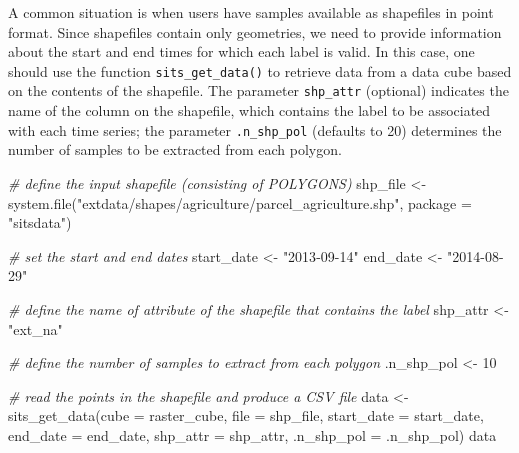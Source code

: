 \documentclass[a4paper,]{tufte-book}
\newenvironment{Shaded}{}{}
\newcommand{\AttributeTok}[1]{\textcolor[rgb]{0.49,0.56,0.16}{#1}}
\newcommand{\CommentTok}[1]{\textcolor[rgb]{0.38,0.63,0.69}{\textit{#1}}}
\newcommand{\DecValTok}[1]{\textcolor[rgb]{0.25,0.63,0.44}{#1}}
\newcommand{\FunctionTok}[1]{\textcolor[rgb]{0.02,0.16,0.49}{#1}}
\newcommand{\NormalTok}[1]{#1}
\newcommand{\OtherTok}[1]{\textcolor[rgb]{0.00,0.44,0.13}{#1}}
\newcommand{\StringTok}[1]{\textcolor[rgb]{0.25,0.44,0.63}{#1}}
\begin{document}
A common situation is when users have samples available as shapefiles in point format. Since shapefiles contain only geometries, we need to provide information about the start and end times for which each label is valid. In this case, one should use the function \texttt{sits\_get\_data()} to retrieve data from a data cube based on the contents of the shapefile. The parameter \texttt{shp\_attr} (optional) indicates the name of the column on the shapefile, which contains the label to be associated with each time series; the parameter \texttt{.n\_shp\_pol} (defaults to 20) determines the number of samples to be extracted from each polygon.

\begin{Shaded}
\begin{Highlighting}[]
\CommentTok{\# define the input shapefile (consisting of POLYGONS)}
\NormalTok{shp\_file }\OtherTok{\textless{}{-}} \FunctionTok{system.file}\NormalTok{(}\StringTok{"extdata/shapes/agriculture/parcel\_agriculture.shp"}\NormalTok{, }
                        \AttributeTok{package =} \StringTok{"sitsdata"}\NormalTok{)}

\CommentTok{\# set the start and end dates }
\NormalTok{start\_date }\OtherTok{\textless{}{-}} \StringTok{"2013{-}09{-}14"}
\NormalTok{end\_date   }\OtherTok{\textless{}{-}} \StringTok{"2014{-}08{-}29"}

\CommentTok{\# define the name of attribute of the shapefile that contains the label}
\NormalTok{shp\_attr }\OtherTok{\textless{}{-}} \StringTok{"ext\_na"}

\CommentTok{\# define the number of samples to extract from each polygon}
\NormalTok{.n\_shp\_pol }\OtherTok{\textless{}{-}} \DecValTok{10}

\CommentTok{\# read the points in the shapefile and produce a CSV file}
\NormalTok{data }\OtherTok{\textless{}{-}} \FunctionTok{sits\_get\_data}\NormalTok{(}\AttributeTok{cube       =}\NormalTok{ raster\_cube, }
                      \AttributeTok{file       =}\NormalTok{ shp\_file, }
                      \AttributeTok{start\_date =}\NormalTok{ start\_date, }
                      \AttributeTok{end\_date   =}\NormalTok{ end\_date, }
                      \AttributeTok{shp\_attr   =}\NormalTok{ shp\_attr, }
                      \AttributeTok{.n\_shp\_pol =}\NormalTok{ .n\_shp\_pol)}
\NormalTok{data}
\end{Highlighting}
\end{Shaded}
\end{document}
